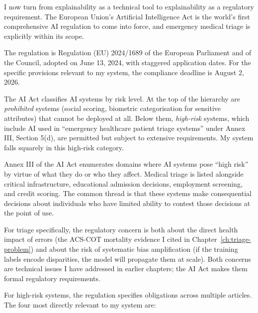 I now turn from explainability as a technical tool to explainability as a regulatory requirement. The European Union's Artificial Intelligence Act is the world's first comprehensive AI regulation to come into force, and emergency medical triage is explicitly within its scope.

The regulation is Regulation (EU) 2024/1689 of the European Parliament and of the Council, adopted on June 13, 2024, with staggered application dates. For the specific provisions relevant to my system, the compliance deadline is August 2, 2026.

The AI Act classifies AI systems by risk level. At the top of the hierarchy are \emph{prohibited} systems (social scoring, biometric categorisation for sensitive attributes) that cannot be deployed at all. Below them, \emph{high-risk} systems, which include AI used in ``emergency healthcare patient triage systems'' under Annex III, Section 5(d), are permitted but subject to extensive requirements. My system falls squarely in this high-risk category.

\begin{notebox}
Annex III of the AI Act enumerates domains where AI systems pose ``high risk'' by virtue of what they do or who they affect. Medical triage is listed alongside critical infrastructure, educational admission decisions, employment screening, and credit scoring. The common thread is that these systems make consequential decisions about individuals who have limited ability to contest those decisions at the point of use.

For triage specifically, the regulatory concern is both about the direct health impact of errors (the ACS-COT mortality evidence I cited in Chapter~\ref{ch:triage-problem}) and about the risk of systematic bias amplification (if the training labels encode disparities, the model will propagate them at scale). Both concerns are technical issues I have addressed in earlier chapters; the AI Act makes them formal regulatory requirements.
\end{notebox}

For high-risk systems, the regulation specifies obligations across multiple articles. The four most directly relevant to my system are:

